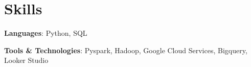 \documentclass[letterpaper,11pt]{article}
\newcommand{\resumeSubHeadingListStart}{\begin{itemize}[leftmargin=*]}
\newcommand{\resumeSubHeadingListEnd}{\end{itemize}}
\begin{document}
\section{Skills}
  \resumeSubHeadingListStart
    \item{
      \textbf{Languages}{: Python, SQL}
   \item
      \textbf{Tools \& Technologies}{: Pyspark, Hadoop, Google Cloud Services, Bigquery, Looker Studio}
    }
  \resumeSubHeadingListEnd


\end{document}
